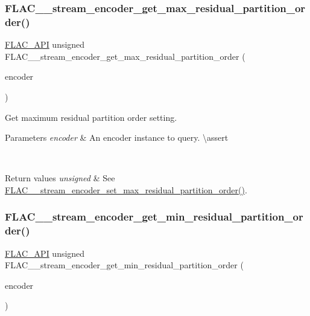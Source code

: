 \subsubsection{\texorpdfstring{FLAC\_\_stream\_encoder\_get\_max\_residual\_partition\_order()}{FLAC\_\_stream\_encoder\_get\_max\_residual\_partition\_order()}}
{\footnotesize\ttfamily \mbox{\hyperlink{group__flac__export_ga56ca07df8a23310707732b1c0007d6f5}{F\+L\+A\+C\+\_\+\+A\+PI}} unsigned F\+L\+A\+C\+\_\+\+\_\+stream\+\_\+encoder\+\_\+get\+\_\+max\+\_\+residual\+\_\+partition\+\_\+order (\begin{DoxyParamCaption}\item[{const \mbox{\hyperlink{struct_f_l_a_c_____stream_encoder}{F\+L\+A\+C\+\_\+\+\_\+\+Stream\+Encoder}} $\ast$}]{encoder }\end{DoxyParamCaption})}

Get maximum residual partition order setting.


\begin{DoxyParams}{Parameters}
{\em encoder} & An encoder instance to query. \textbackslash{}assert 
\begin{DoxyCode}{1}
\end{DoxyCode}
 \\
\hline
\end{DoxyParams}

\begin{DoxyRetVals}{Return values}
{\em unsigned} & See \mbox{\hyperlink{group__flac__stream__encoder_ga6de153da5a8eeeb1be2271c27fa58b37}{F\+L\+A\+C\+\_\+\+\_\+stream\+\_\+encoder\+\_\+set\+\_\+max\+\_\+residual\+\_\+partition\+\_\+order()}}. \\
\hline
\end{DoxyRetVals}
\mbox{\label{group__flac__stream__encoder_gace80859226b77f40b7b06314b26aa478}} 
\subsubsection{\texorpdfstring{FLAC\_\_stream\_encoder\_get\_min\_residual\_partition\_order()}{FLAC\_\_stream\_encoder\_get\_min\_residual\_partition\_order()}}
{\footnotesize\ttfamily \mbox{\hyperlink{group__flac__export_ga56ca07df8a23310707732b1c0007d6f5}{F\+L\+A\+C\+\_\+\+A\+PI}} unsigned F\+L\+A\+C\+\_\+\+\_\+stream\+\_\+encoder\+\_\+get\+\_\+min\+\_\+residual\+\_\+partition\+\_\+order (\begin{DoxyParamCaption}\item[{const \mbox{\hyperlink{struct_f_l_a_c_____stream_encoder}{F\+L\+A\+C\+\_\+\+\_\+\+Stream\+Encoder}} $\ast$}]{encoder }\end{DoxyParamCaption})}

